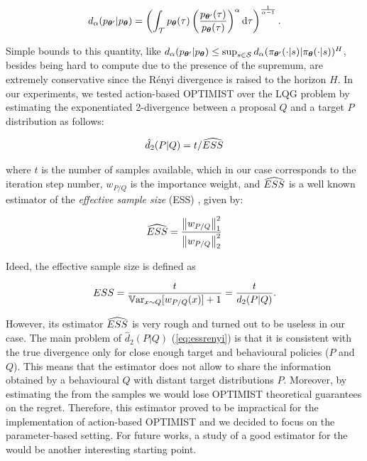 \begin{align}
	d_{\alpha}(p_{\vtheta'}|p_{\vtheta}) = \left(\int_{\Tau}p_{\vtheta}(\tau)\left(\frac{p_{\vtheta'}(\tau)}{p_{\vtheta}(\tau)}\right)^{\alpha}\de \tau\right)^{\frac{1}{\alpha-1}}.
\end{align}

Simple bounds to this quantity, like $d_{\alpha}(p_{\vtheta'}|p_{\vtheta})\leq\sup_{s\in\Sspace}d_{\alpha}(\pi_{\vtheta'}(\cdot|s)|\pi_{\vtheta}(\cdot|s))^H$, besides being hard to compute due to the presence of the supremum, are extremely conservative since the Rényi divergence is raised to the horizon $H$. In our experiments, we tested action-based \gls{OPTIMIST} over the \gls{LQG} problem by estimating the exponentiated 2-\Renyi divergence between a proposal $Q$ and a target $P$ distribution as follows:

\begin{align} \label{eq:essrenyi}
\hat{d}_{2}(P|Q)=t / \wh{ESS}
\end{align}

where $t$ is the number of samples available, which in our case corresponds to the iteration step number, $w_{P/Q}$ is the importance weight, and $\wh{ESS}$ \cite{martino2017effective} is a well known estimator of the \emph{effective sample size} (ESS) \cite{kong1992note}, given by:

\begin{align}
\wh{ESS} = \frac{\norm[1]{w_{P/Q}}^2}{\norm[2]{w_{P/Q}}^2}
\end{align}

Ideed, the effective sample size is defined as \cite{kong1992note}

\begin{align}
ESS = \frac{t}{\Var_{x\sim Q}[w_{P/Q}(x)]+1}=\frac{t}{d_{2}(P|Q)}.
\end{align}

However, its estimator $\wh{ESS}$ is very rough and turned out to be useless in our case. The main problem of $\hat{d}_{2}(P|Q)$ (\ref{eq:essrenyi}) is that it is consistent with the true \Renyi divergence only for close enough target and behavioural policies ($P$ and $Q$). This means that the estimator does not allow to share the information obtained by a behavioural $Q$ with distant target distributions $P$. Moreover, by estimating the \Renyi from the samples we would lose \gls{OPTIMIST} theoretical guarantees on the regret. Therefore, this estimator proved to be impractical for the implementation of action-based \gls{OPTIMIST} and we decided to focus on the parameter-based setting. For future works, a study of a good estimator for the \Renyi would be another interesting starting point.
